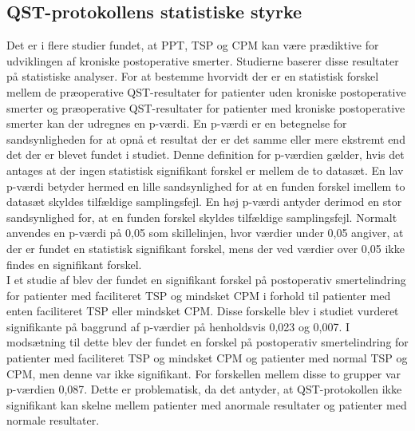 \subsection{QST-protokollens statistiske styrke}
Det er i flere studier fundet, at PPT, TSP og CPM kan være prædiktive for udviklingen af kroniske postoperative smerter. \citep{Wylde2016c} \citep{Petersen2016} \citep{Petersen2015} Studierne baserer disse resultater på statistiske analyser. For at bestemme hvorvidt der er en statistisk forskel mellem de præoperative QST-resultater for patienter uden kroniske postoperative smerter og præoperative QST-resultater for patienter med kroniske postoperative smerter kan der udregnes en p-værdi. En p-værdi er en betegnelse for sandsynligheden for at opnå et resultat der er det samme eller mere ekstremt end det der er blevet fundet i studiet. Denne definition for p-værdien gælder, hvis det antages at der ingen statistisk signifikant forskel er mellem de to datasæt. En lav p-værdi betyder hermed en lille sandsynlighed for at en funden forskel imellem to datasæt skyldes tilfældige samplingsfejl. En høj p-værdi antyder derimod en stor sandsynlighed for, at en funden forskel skyldes tilfældige samplingsfejl. Normalt anvendes en p-værdi på 0,05 som skillelinjen, hvor værdier under 0,05 angiver, at der er fundet en statistisk signifikant forskel, mens der ved værdier over 0,05 ikke findes en signifikant forskel. \citep{Zar2010} \\
I et studie af  blev der fundet en signifikant forskel på postoperativ smertelindring for patienter med faciliteret TSP og mindsket CPM i forhold til patienter med enten faciliteret TSP eller mindsket CPM. Disse forskelle blev i studiet vurderet signifikante på baggrund af p-værdier på henholdsvis 0,023 og 0,007. I modsætning til dette blev der fundet en forskel på postoperativ smertelindring for patienter med faciliteret TSP og mindsket CPM og patienter med normal TSP og CPM, men denne var ikke signifikant. For forskellen mellem disse to grupper var p-værdien 0,087. \citep{Petersen2016} Dette er problematisk, da det antyder, at QST-protokollen ikke signifikant kan skelne mellem patienter med anormale resultater og patienter med normale resultater. \\ %
